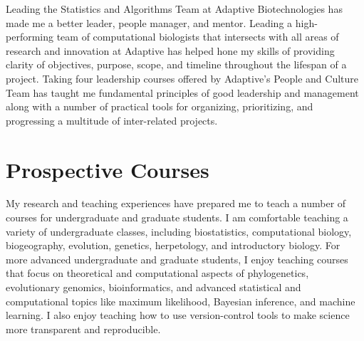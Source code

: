 Leading the Statistics and Algorithms Team at Adaptive Biotechnologies has made
me a better leader, people manager, and mentor.
Leading a high-performing team of computational biologists that intersects with
all areas of research and innovation at Adaptive has helped hone my skills of
providing clarity of objectives, purpose, scope, and timeline throughout the
lifespan of a project.
Taking four leadership courses offered by Adaptive's People and Culture Team
has taught me fundamental principles of good leadership and management along
with a number of practical tools for organizing, prioritizing, and progressing
a multitude of inter-related projects.


\section*{Prospective Courses}


My research and teaching experiences have prepared me to teach a number of
courses for undergraduate and graduate students.
I am comfortable teaching a variety of undergraduate classes, including
biostatistics,
computational biology,
biogeography,
evolution,
genetics,
herpetology,
and
introductory biology.
For more advanced undergraduate and graduate students, I enjoy teaching courses
that focus on theoretical and computational aspects of
phylogenetics,
evolutionary genomics,
bioinformatics,
and
advanced statistical and computational topics like
maximum likelihood,
Bayesian inference,
and
machine learning.
I also enjoy teaching how to use version-control tools to make science more
transparent and reproducible.

